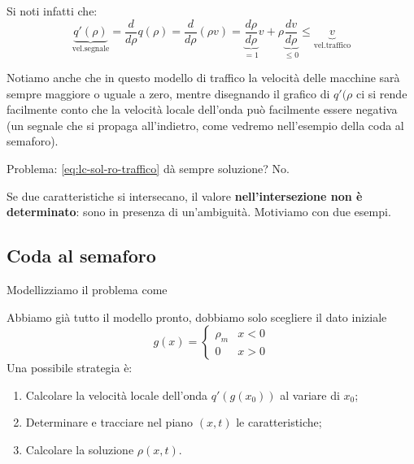\documentclass[10pt,a4paper,twoside,openright]{book}
\begin{document}
Si noti infatti che:
\begin{equation*}
	\underbrace{q'(\rho)}_{\text{vel.segnale}} = \frac{d}{d\rho }q(\rho ) = \frac{d}{d\rho }(\rho v) = \underbrace{\frac{d\rho }{d\rho }}_{=1}v + \rho \underbrace{\frac{dv}{d\rho}}_{\le 0} \le \underbrace{v}_{\text{vel.traffico}}
\end{equation*}

Notiamo anche che in questo modello di traffico la velocità delle macchine sarà sempre maggiore o uguale a zero, mentre disegnando il grafico di $q'(\rho $ ci si rende facilmente conto che la velocità locale dell'onda può facilmente essere negativa (un segnale che si propaga all'indietro, come vedremo nell'esempio della coda al semaforo).

Problema: \eqref{eq:lc-sol-ro-traffico} dà sempre soluzione? No.


Se due caratteristiche si intersecano, il valore \textbf{nell'intersezione non è determinato}: sono in presenza di un'ambiguità. Motiviamo con due esempi.
\subsection{Coda al semaforo}

Modellizziamo il problema come

Abbiamo già tutto il modello pronto, dobbiamo solo scegliere il dato iniziale
\begin{equation}
	g( x) =
	\begin{cases}
		\rho _{m} & x< 0 \\
		0         & x >0 
	\end{cases}
\end{equation}
Una possibile strategia è:
\begin{enumerate}
	\item Calcolare la velocità locale dell'onda $q'( g( x_{0}))$ al variare di $x_{0}$;
	\item Determinare e tracciare nel piano $( x,t)$ le caratteristiche;
	\item Calcolare la soluzione $\rho ( x,t)$.
\end{enumerate}
\end{document}
